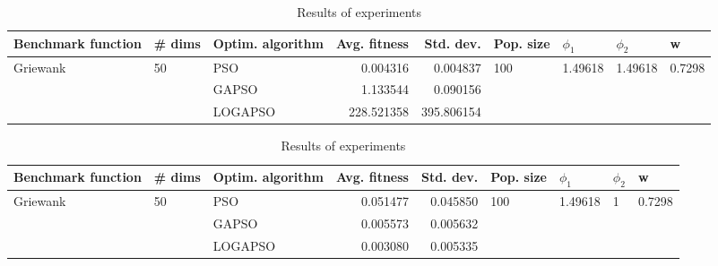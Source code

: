 \documentclass{article}
\begin{document}
\begin{table}
\centering
\caption{Results of experiments}
\begin{tabular}{lllrrllll}
\toprule
       Benchmark function &             \# dims & Optim. algorithm &  Avg. fitness &  Std. dev. &            Pop. size &               $\phi_{1}$ &               $\phi_{2}$ &                       w \\
\midrule
\multirow{3}{*}{Griewank} & \multirow{3}{*}{50} &              PSO &      0.004316 &   0.004837 & \multirow{3}{*}{100} & \multirow{3}{*}{1.49618} & \multirow{3}{*}{1.49618} & \multirow{3}{*}{0.7298} \\
                          &                     &            GAPSO &      1.133544 &   0.090156 &                      &                          &                          &                         \\
                          &                     &          LOGAPSO &    228.521358 & 395.806154 &                      &                          &                          &                         \\
\bottomrule
\end{tabular}
\end{table}
\begin{table}
\centering
\caption{Results of experiments}
\begin{tabular}{lllrrllll}
\toprule
       Benchmark function &             \# dims & Optim. algorithm &  Avg. fitness &  Std. dev. &            Pop. size &               $\phi_{1}$ &         $\phi_{2}$ &                       w \\
\midrule
\multirow{3}{*}{Griewank} & \multirow{3}{*}{50} &              PSO &      0.051477 &   0.045850 & \multirow{3}{*}{100} & \multirow{3}{*}{1.49618} & \multirow{3}{*}{1} & \multirow{3}{*}{0.7298} \\
                          &                     &            GAPSO &      0.005573 &   0.005632 &                      &                          &                    &                         \\
                          &                     &          LOGAPSO &      0.003080 &   0.005335 &                      &                          &                    &                         \\
\bottomrule
\end{tabular}
\end{table}
\end{document}
